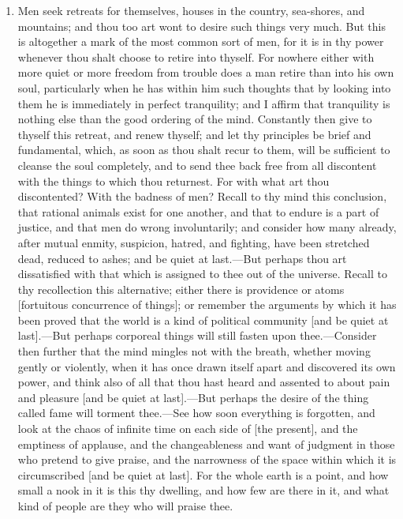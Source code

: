 \begin{enumerate}
\item Men seek retreats for themselves, houses in the country, sea-shores, and mountains; and thou too art wont to desire such things very much. But this is altogether a mark of the most common sort of men, for it is in thy power whenever thou shalt choose to retire into thyself. For nowhere either with more quiet or more freedom from trouble does a man retire than into his own soul, particularly when he has within him such thoughts that by looking into them he is immediately in perfect tranquility; and I affirm that tranquility is nothing else than the good ordering of the mind. Constantly then give to thyself this retreat, and renew thyself; and let thy principles be brief and fundamental, which, as soon as thou shalt recur to them, will be sufficient to cleanse the soul completely, and to send thee back free from all discontent with the things to which thou returnest. For with what art thou discontented? With the badness of men? Recall to thy mind this conclusion, that rational animals exist for one another, and that to endure is a part of justice, and that men do wrong involuntarily; and consider how many already, after mutual enmity, suspicion, hatred, and fighting, have been stretched dead, reduced to ashes; and be quiet at last.—But perhaps thou art dissatisfied with that which is assigned to thee out of the universe. Recall to thy recollection this alternative; either there is providence or atoms [{\clarify fortuitous concurrence of things}]; or remember the arguments by which it has been proved that the world is a kind of political community [{\clarify and be quiet at last}].—But perhaps corporeal things will still fasten upon thee.—Consider then further that the mind mingles not with the breath, whether moving gently or violently, when it has once drawn itself apart and discovered its own power, and think also of all that thou hast heard and assented to about pain and pleasure [{\clarify and be quiet at last}].—But perhaps the desire of the thing called fame will torment thee.—See how soon everything is forgotten, and look at the chaos of infinite time on each side of [{\clarify the present}], and the emptiness of applause, and the changeableness and want of judgment in those who pretend to give praise, and the narrowness of the space within which it is circumscribed [{\clarify and be quiet at last}]. For the whole earth is a point, and how small a nook in it is this thy dwelling, and how few are there in it, and what kind of people are they who will praise thee.


\end{enumerate}
